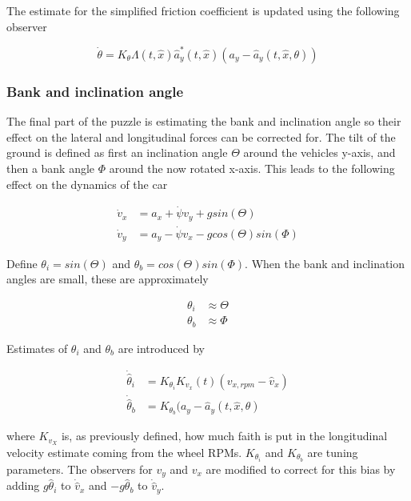 The estimate for the simplified friction coefficient is updated using the following observer

\begin{equation}
    \dot{\theta} = K_{\theta}\Lambda (t, \hat{x})\hat{a}_y^*(t,\hat{x})(a_y - \hat{a}_y(t,\hat{x},\theta))
\end{equation}

\subsubsection{Bank and inclination angle}

The final part of the puzzle is estimating the bank and inclination angle so their effect on the lateral and longitudinal forces can be corrected for. The tilt of the ground is defined as first an inclination angle $\Theta$ around the vehicles y-axis, and then a bank angle $\Phi$ around the now rotated x-axis. This leads to the following effect on the dynamics of the car

\begin{align}
    \dot{v}_x & = a_x + \dot{\psi} v_y + g sin(\Theta) \\
    \dot{v}_y & = a_y - \dot{\psi}v_x - g cos(\Theta) sin(\Phi)
\end{align}

Define $\theta_i = sin(\Theta)$ and $\theta_b = cos(\Theta)sin(\Phi)$. When the bank and inclination angles are small, these are approximately 

\begin{align}
    \theta_i & \approx \Theta \\
    \theta_b & \approx \Phi
\end{align}

Estimates of $\theta_i$ and $\theta_b$ are introduced by

\begin{align}
    \dot{\hat{\theta}}_i & = K_{\theta_i}K_{v_x}(t)(v_{x,rpm} - \hat{v}_x) \\
    \dot{\hat{\theta}}_b & = K_{\theta_b}(a_y-\hat{a}_y(t,\hat{x},\theta)
\end{align}

where $K_{v_X}$ is, as previously defined, how much faith is put in the longitudinal velocity estimate coming from the wheel \glspl{RPM}. $K_{\theta_i}$ and $K_{\theta_b}$ are tuning parameters. The observers for $v_y$ and $v_x$ are modified to correct for this bias by adding $g\hat{\theta}_i$ to $\dot{\hat{v}}_x$ and $-g\hat{\theta}_b$ to $\dot{\hat{v}}_y$. 

